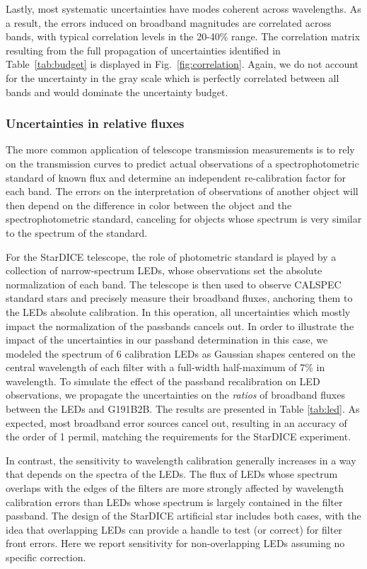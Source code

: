 Lastly, most systematic uncertainties have modes coherent across
wavelengths. As a result, the errors induced on broadband magnitudes
are correlated across bands, with typical correlation levels in the
20-40\% range. The correlation matrix resulting from the full
propagation of uncertainties identified in Table~\ref{tab:budget} is
displayed in Fig.~\ref{fig:correlation}. Again, we do not account for
the uncertainty in the gray scale which is perfectly correlated
between all bands and would dominate the uncertainty budget.

\subsubsection{Uncertainties in relative fluxes}
\label{sec:relative}

The more common application of telescope transmission measurements is
to rely on the transmission curves to predict actual
observations of a spectrophotometric standard of known flux and
determine an independent re-calibration factor for each band. The
errors on the interpretation of observations of another object will
then depend on the difference in color between the object and the
spectrophotometric standard, canceling for objects whose spectrum is
very similar to the spectrum of the standard.

For the StarDICE telescope, the role of photometric standard is played
by a collection of narrow-spectrum LEDs, whose observations set the
absolute normalization of each band. The telescope is then used to
observe CALSPEC standard stars and precisely measure their broadband
fluxes, anchoring them to the LEDs absolute calibration.
In this operation, all uncertainties which mostly impact the
normalization of the passbands cancels out. In order to illustrate the
impact of the uncertainties in our passband determination in this
case, we modeled the spectrum of 6 calibration LEDs as Gaussian shapes
centered on the central wavelength of each filter with a full-width
half-maximum of 7\% in wavelength. 
To simulate the effect of the passband recalibration on LED
observations, we propagate the uncertainties on the \emph{ratios} of
broadband fluxes between the LEDs and G191B2B. The results are
presented in Table \ref{tab:led}. As expected, most broadband error
sources cancel out, resulting in an accuracy of the order of 1 permil,
matching the requirements for the StarDICE experiment.

In contrast, the sensitivity to wavelength calibration generally
increases in a way that depends on the spectra of the LEDs. The flux of
LEDs whose spectrum overlaps with the edges of the filters are more
strongly affected by wavelength calibration errors than LEDs whose
spectrum is largely contained in the filter passband. The design of
the StarDICE artificial star includes both cases, with the idea that
overlapping LEDs can provide a handle to test (or correct) for filter
front errors. Here we report sensitivity for non-overlapping LEDs
assuming no specific correction.

